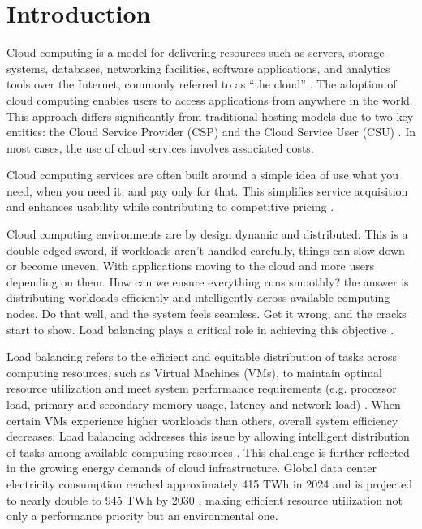 \documentclass[pdflatex,sn-mathphys-num]{sn-jnl}%
\begin{document}
\maketitle
\clearpage

\section{Introduction}\label{sec1}
Cloud computing is a model for delivering resources such as servers, storage systems, databases, networking facilities, software applications, and analytics tools over the Internet, commonly referred to as “the cloud” \cite{cloudComputing}. The adoption of cloud computing enables users to access applications from anywhere in the world. This approach differs significantly from traditional hosting models due to two key entities: the Cloud Service Provider (CSP) and the Cloud Service User (CSU) \cite{Convergence}. In most cases, the use of cloud services involves associated costs.

Cloud computing services are often built around a simple idea of use what you need, when you need it, and pay only for that. This simplifies service acquisition and enhances usability while contributing to competitive pricing \cite{cloudComputing}.

Cloud computing environments are by design dynamic and distributed. This is a double edged sword, if workloads aren’t handled carefully, things can slow down or become uneven.
With applications moving to the cloud and more users depending on them. How can we ensure everything runs smoothly? the answer is distributing workloads efficiently and intelligently across available computing nodes. Do that well, and the system feels seamless. Get it wrong, and the cracks start to show. Load balancing plays a critical role in achieving this objective \cite{JitendraWorkloadPrediction, Rana2024VMSchedulingSLR}.

Load balancing refers to the efficient and equitable distribution of tasks across computing resources, such as Virtual Machines (VMs), to maintain optimal resource utilization and meet system performance requirements (e.g. processor load, primary and secondary memory usage, latency and network load) \cite{loadBalancing}. When certain VMs experience higher workloads than others, overall system efficiency decreases. Load balancing addresses this issue by allowing intelligent distribution of tasks among available computing resources \cite{bib6}. This challenge is further reflected in the growing energy demands of cloud infrastructure. Global data center electricity consumption reached approximately 415 TWh in 2024 and is projected to nearly double to 945 TWh by 2030 \cite{IEA2025EnergyAI}, making efficient resource utilization not only a performance priority but an environmental one.
\end{document}
